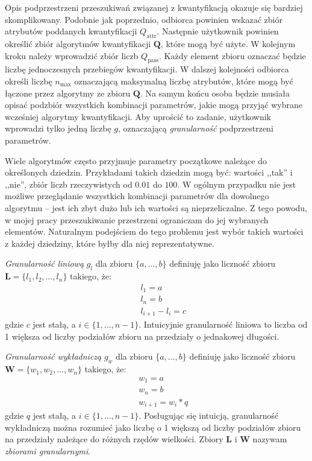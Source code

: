 \documentclass[../thesis.tex]{subfiles}
\begin{document}
Opis podprzestrzeni przeszukiwań związanej z kwantyfikacją okazuje się bardziej skomplikowany. Podobnie jak poprzednio, odbiorca powinien wskazać zbiór atrybutów poddanych kwantyfikacji $Q_\textrm{attr}$. Następnie użytkownik powinien określić zbiór algorytmów kwantyfikacji $\textbf{Q}$, które mogą być użyte. W kolejnym kroku należy wprowadzić zbiór liczb $Q_\textrm{pass}$. Każdy element zbioru oznaczać będzie liczbę jednoczesnych przebiegów kwantyfikacji. W dalszej kolejności odbiorca określi liczbę $n_\textrm{max}$ oznaczającą maksymalną liczbę atrybutów, które mogą być łączone przez algorytmy ze zbioru $\textbf{Q}$. Na samym końcu osoba będzie musiała opisać podzbiór wszystkich kombinacji parametrów, jakie mogą przyjąć wybrane wcześniej algorytmy kwantyfikacji. Aby uprościć to zadanie, użytkownik wprowadzi tylko jedną liczbę $g$, oznaczającą \textit{granularność} podprzestrzeni parametrów. 

Wiele algorytmów często przyjmuje parametry początkowe należące do określonych dziedzin. Przykładami takich dziedzin mogą być: wartości ,,tak'' i ,,nie'', zbiór liczb rzeczywistych od $0.01$ do $100$. W ogólnym przypadku nie jest możliwe przeglądanie wszystkich kombinacji parametrów dla dowolnego algorytmu -- jest ich zbyt dużo lub ich wartości są nieprzeliczalne. Z tego powodu, w mojej pracy przeszukiwanie przestrzeni ograniczam do jej wybranych elementów. Naturalnym podejściem do tego problemu jest wybór takich wartości z każdej dziedziny, które byłby dla niej reprezentatywne. 

\textit{Granularność liniową} $g_l$ dla zbioru $\{a, \ldots, b\}$ definiuję jako liczność zbioru $\textbf{L} = \{l_1, l_2, \ldots, l_n\}$ takiego, że:
\begin{eqnarray*}
&& l_1 = a \\
&& l_n = b \\
&& l_{i+1} - l_i = c
\end{eqnarray*}
gdzie $c$ jest stałą, a $i \in \{1, \ldots, n-1\}$. Intuicyjnie granularność liniowa to liczba od 1 większa od liczby podziałów zbioru na przedziały o jednakowej długości.

\textit{Granularność wykładniczą} $g_w$ dla zbioru $\{a, \ldots, b\}$ definiuję jako liczność zbioru $\textbf{W} = \{w_1, w_2, \ldots, w_n\}$ takiego, że:
\begin{eqnarray*}
&& w_1 = a \\
&& w_n = b \\
&& w_{i+1} = w_i * q
\end{eqnarray*}
gdzie $q$ jest stałą, a $i \in \{1, \ldots, n-1\}$. Posługując się intuicją, granularność wykładniczą można rozumieć jako liczbę o 1 większą od liczby podziałów zbioru na przedziały należące do różnych rzędów wielkości. Zbiory $\textbf{L}$ i $\textbf{W}$ nazywam \textit{zbiorami granularnymi}.
\end{document}

